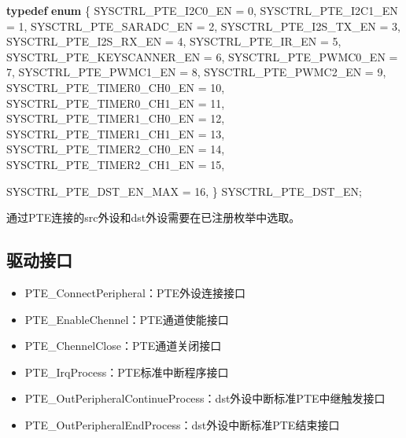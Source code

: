 \documentclass[
  12pt,
]{book}
\newenvironment{Shaded}{\begin{snugshade}}{\end{snugshade}}
\newcommand{\DecValTok}[1]{\textcolor[rgb]{0.00,0.00,0.81}{#1}}
\newcommand{\KeywordTok}[1]{\textcolor[rgb]{0.13,0.29,0.53}{\textbf{#1}}}
\newcommand{\NormalTok}[1]{#1}
\begin{document}
\begin{Shaded}
\begin{Highlighting}[]
\KeywordTok{typedef} \KeywordTok{enum}
\NormalTok{\{}
\NormalTok{    SYSCTRL_PTE_I2C0_EN        = }\DecValTok{0}\NormalTok{,}
\NormalTok{    SYSCTRL_PTE_I2C1_EN        = }\DecValTok{1}\NormalTok{,}
\NormalTok{    SYSCTRL_PTE_SARADC_EN      = }\DecValTok{2}\NormalTok{,}
\NormalTok{    SYSCTRL_PTE_I2S_TX_EN      = }\DecValTok{3}\NormalTok{,}
\NormalTok{    SYSCTRL_PTE_I2S_RX_EN      = }\DecValTok{4}\NormalTok{,}
\NormalTok{    SYSCTRL_PTE_IR_EN          = }\DecValTok{5}\NormalTok{,}
\NormalTok{    SYSCTRL_PTE_KEYSCANNER_EN  = }\DecValTok{6}\NormalTok{,}
\NormalTok{    SYSCTRL_PTE_PWMC0_EN       = }\DecValTok{7}\NormalTok{,}
\NormalTok{    SYSCTRL_PTE_PWMC1_EN       = }\DecValTok{8}\NormalTok{,}
\NormalTok{    SYSCTRL_PTE_PWMC2_EN       = }\DecValTok{9}\NormalTok{,}
\NormalTok{    SYSCTRL_PTE_TIMER0_CH0_EN  = }\DecValTok{10}\NormalTok{,}
\NormalTok{    SYSCTRL_PTE_TIMER0_CH1_EN  = }\DecValTok{11}\NormalTok{,}
\NormalTok{    SYSCTRL_PTE_TIMER1_CH0_EN  = }\DecValTok{12}\NormalTok{,}
\NormalTok{    SYSCTRL_PTE_TIMER1_CH1_EN  = }\DecValTok{13}\NormalTok{,}
\NormalTok{    SYSCTRL_PTE_TIMER2_CH0_EN  = }\DecValTok{14}\NormalTok{,}
\NormalTok{    SYSCTRL_PTE_TIMER2_CH1_EN  = }\DecValTok{15}\NormalTok{,}

\NormalTok{    SYSCTRL_PTE_DST_EN_MAX     = }\DecValTok{16}\NormalTok{,}
\NormalTok{\} SYSCTRL_PTE_DST_EN;}
\end{Highlighting}
\end{Shaded}

通过PTE连接的src外设和dst外设需要在已注册枚举中选取。

\hypertarget{ux9a71ux52a8ux63a5ux53e3-1}{%
\subsection{驱动接口}\label{ux9a71ux52a8ux63a5ux53e3-1}}

\begin{itemize}
\item
  PTE\_ConnectPeripheral：PTE外设连接接口
\item
  PTE\_EnableChennel：PTE通道使能接口
\item
  PTE\_ChennelClose：PTE通道关闭接口
\item
  PTE\_IrqProcess：PTE标准中断程序接口
\item
  PTE\_OutPeripheralContinueProcess：dst外设中断标准PTE中继触发接口
\item
  PTE\_OutPeripheralEndProcess：dst外设中断标准PTE结束接口
\end{itemize}
\end{document}
